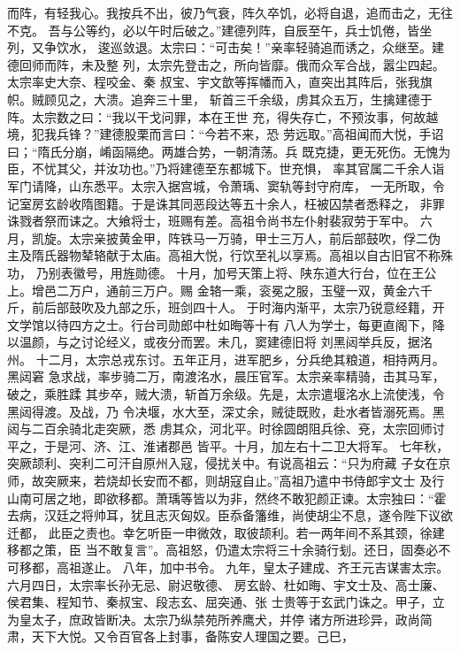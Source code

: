\documentclass[12pt,UTF8]{ctexbook}
\begin{document}
而阵，有轻我心。我按兵不出，彼乃气衰，阵久卒饥，必将自退，追而击之，无往不克。
吾与公等约，必以午时后破之。”建德列阵，自辰至午，兵士饥倦，皆坐列，又争饮水，
逡巡敛退。太宗曰：“可击矣！”亲率轻骑追而诱之，众继至。建德回师而阵，未及整
列，太宗先登击之，所向皆靡。俄而众军合战，嚣尘四起。太宗率史大奈、程咬金、秦
叔宝、宇文歆等挥幡而入，直突出其阵后，张我旗帜。贼顾见之，大溃。追奔三十里，
斩首三千余级，虏其众五万，生擒建德于阵。太宗数之曰：“我以干戈问罪，本在王世
充，得失存亡，不预汝事，何故越境，犯我兵锋？”建德股栗而言曰：“今若不来，恐
劳远取。”高祖闻而大悦，手诏曰；“隋氏分崩，崤函隔绝。两雄合势，一朝清荡。兵
既克捷，更无死伤。无愧为臣，不忧其父，并汝功也。”乃将建德至东都城下。世充惧，
率其官属二千余人诣军门请降，山东悉平。太宗入据宫城，令萧瑀、窦轨等封守府库，
一无所取，令记室房玄龄收隋图籍。于是诛其同恶段达等五十余人，枉被囚禁者悉释之，
非罪诛戮者祭而诔之。大飨将士，班赐有差。高祖令尚书左仆射裴寂劳于军中。
六月，凯旋。太宗亲披黄金甲，阵铁马一万骑，甲士三万人，前后部鼓吹，俘二伪
主及隋氏器物辇辂献于太庙。高祖大悦，行饮至礼以享焉。高祖以自古旧官不称殊功，
乃别表徽号，用旌勋德。
十月，加号天策上将、陕东道大行台，位在王公上。增邑二万户，通前三万户。赐
金辂一乘，衮冕之服，玉璧一双，黄金六千斤，前后部鼓吹及九部之乐，班剑四十人。
于时海内渐平，太宗乃锐意经籍，开文学馆以待四方之士。行台司勋郎中杜如晦等十有
八人为学士，每更直阁下，降以温颜，与之讨论经义，或夜分而罢。未几，窦建德旧将
刘黑闼举兵反，据洺州。
十二月，太宗总戎东讨。五年正月，进军肥乡，分兵绝其粮道，相持两月。黑闼窘
急求战，率步骑二万，南渡洺水，晨压官军。太宗亲率精骑，击其马军，破之，乘胜蹂
其步卒，贼大溃，斩首万余级。先是，太宗遣堰洺水上流使浅，令黑闼得渡。及战，乃
令决堰，水大至，深丈余，贼徒既败，赴水者皆溺死焉。黑闼与二百余骑北走突厥，悉
虏其众，河北平。时徐圆朗阻兵徐、兗，太宗回师讨平之，于是河、济、江、淮诸郡邑
皆平。十月，加左右十二卫大将军。
七年秋，突厥颉利、突利二可汗自原州入寇，侵扰关中。有说高祖云：“只为府藏
子女在京师，故突厥来，若烧却长安而不都，则胡寇自止。”高祖乃遣中书侍郎宇文士
及行山南可居之地，即欲移都。萧瑀等皆以为非，然终不敢犯颜正谏。太宗独曰：“霍
去病，汉廷之将帅耳，犹且志灭匈奴。臣忝备籓维，尚使胡尘不息，遂令陛下议欲迁都，
此臣之责也。幸乞听臣一申微效，取彼颉利。若一两年间不系其颈，徐建移都之策，臣
当不敢复言”。高祖怒，仍遣太宗将三十余骑行刬。还日，固奏必不可移都，高祖遂止。
八年，加中书令。
九年，皇太子建成、齐王元吉谋害太宗。六月四日，太宗率长孙无忌、尉迟敬德、
房玄龄、杜如晦、宇文士及、高士廉、侯君集、程知节、秦叔宝、段志玄、屈突通、张
士贵等于玄武门诛之。甲子，立为皇太子，庶政皆断决。太宗乃纵禁苑所养鹰犬，并停
诸方所进珍异，政尚简肃，天下大悦。又令百官各上封事，备陈安人理国之要。己巳，
\end{document}
